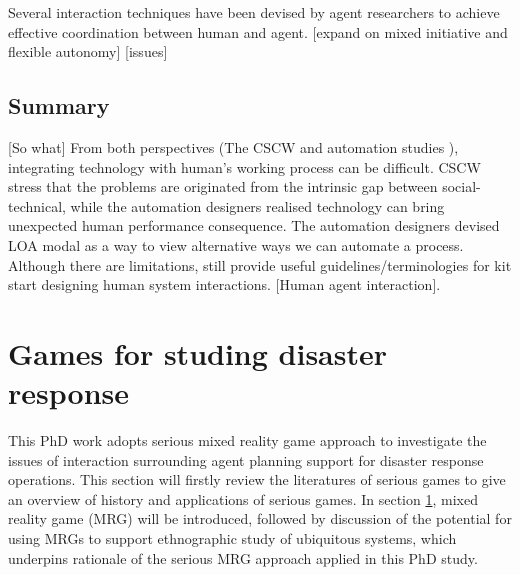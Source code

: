 Several interaction techniques have been devised by agent researchers to achieve effective coordination between human and agent. [expand on mixed initiative and flexible autonomy] [issues]\\


\subsection{Summary}
[So what] From both perspectives (The CSCW and automation studies ), integrating technology with human's working process can be difficult. CSCW stress that the problems are originated from the intrinsic gap between social-technical, while the automation designers realised technology can bring unexpected human performance consequence. The automation designers devised LOA modal as a way to view alternative ways we can automate a process. Although there are limitations, still provide useful guidelines/terminologies for kit start designing human system interactions. [Human agent interaction]. \\ 



\section{Games for studing disaster response} \label{sec:LRMRgame}
This PhD work adopts serious mixed reality game approach to investigate the issues of interaction surrounding agent planning support for disaster response operations. This section will firstly review the literatures of serious games to give an overview of history and applications of serious games. In section \ref{sec:LRMRgame}, mixed reality game (MRG) will be introduced, followed by discussion of the potential for using MRGs to support ethnographic study of ubiquitous systems, which underpins rationale of the serious MRG approach applied in this PhD study.\\ 



